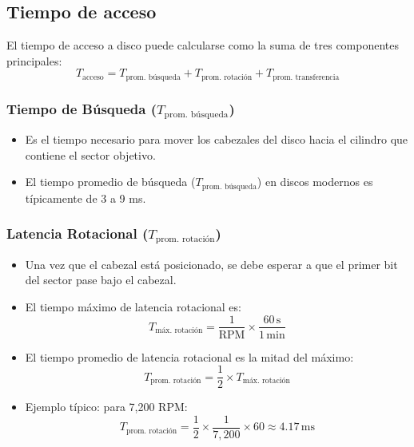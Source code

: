 \subsection{Tiempo de acceso}
El tiempo de acceso a disco puede calcularse como la suma de tres componentes principales:
\begin{equation*}
T_{\text{acceso}} = T_{\text{prom. búsqueda}} + T_{\text{prom. rotación}} + T_{\text{prom. transferencia}}
\end{equation*}

\subsubsection*{Tiempo de Búsqueda (\(T_{\text{prom. búsqueda}}\))}
\begin{itemize}
    \item Es el tiempo necesario para mover los cabezales del disco hacia el cilindro que contiene el sector objetivo.
    \item El tiempo promedio de búsqueda (\(T_{\text{prom. búsqueda}}\)) en discos modernos es típicamente de 3 a 9 ms.
\end{itemize}

\subsubsection*{Latencia Rotacional (\(T_{\text{prom. rotación}}\))}
\begin{itemize}
    \item Una vez que el cabezal está posicionado, se debe esperar a que el primer bit del sector pase bajo el cabezal.
    \item El tiempo máximo de latencia rotacional es:
    \begin{equation*}
    T_{\text{máx. rotación}} = \frac{1}{\text{RPM}} \times \frac{60 \, \text{s}}{1 \, \text{min}}
    \end{equation*}
    \item El tiempo promedio de latencia rotacional es la mitad del máximo:
    \begin{equation*}
    T_{\text{prom. rotación}} = \frac{1}{2} \times T_{\text{máx. rotación}}
    \end{equation*}
    \item Ejemplo típico: para 7,200 RPM:
    \begin{equation*}
    T_{\text{prom. rotación}} = \frac{1}{2} \times \frac{1}{7,200} \times 60 \approx 4.17 \, \text{ms}
    \end{equation*}
\end{itemize}

